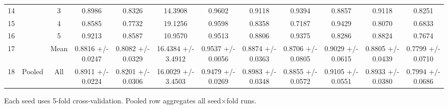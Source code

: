 \begin{table}[htbp]
\begin{tabular}{lccccccccccc}
    14 &  & 3 & 0.8986 & 0.8326 & 14.3908 & 0.9602 & 0.9118 & 0.9394 & 0.8857 & 0.9118 & 0.8251 \\
    15 &  & 4 & 0.8585 & 0.7732 & 19.1256 & 0.9598 & 0.8358 & 0.7187 & 0.9429 & 0.8070 & 0.6833 \\
    16 &  & 5 & 0.9213 & 0.8587 & 10.9570 & 0.9513 & 0.8806 & 0.9375 & 0.8286 & 0.8824 & 0.7674 \\
    17 &  & Mean & 0.8816 +/- 0.0247 & 0.8082 +/- 0.0329 & 16.4384 +/- 3.4912 & 0.9537 +/- 0.0056 & 0.8874 +/- 0.0363 & 0.8706 +/- 0.0805 & 0.9029 +/- 0.0615 & 0.8805 +/- 0.0439 & 0.7799 +/- 0.0710 \\
    \cmidrule(lr){1-12}
    18 & Pooled & All & 0.8911 +/- 0.0224 & 0.8201 +/- 0.0306 & 16.0029 +/- 3.4503 & 0.9479 +/- 0.0269 & 0.8983 +/- 0.0348 & 0.8855 +/- 0.0572 & 0.9105 +/- 0.0551 & 0.8933 +/- 0.0380 & 0.7994 +/- 0.0686 \\
    \bottomrule
  \end{tabular}
  \vspace{2pt}
  \footnotesize{Each seed uses 5-fold cross-validation. Pooled row aggregates all seed$\times$fold runs.}
\end{table}